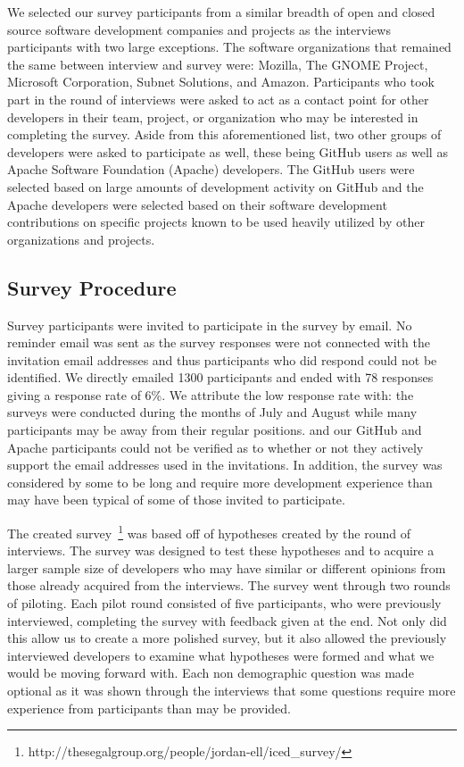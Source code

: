 \documentclass[conference]{IEEEtran}
\begin{document}
We selected our survey participants from a similar breadth of open and closed source software development 
companies and projects as the interviews participants with two large exceptions. The software organizations
that remained the same between interview and survey were: Mozilla, The GNOME Project, Microsoft Corporation, 
Subnet Solutions, and Amazon.
Participants who took part in the round of interviews were asked to act as a contact point for other 
developers in their team, project, or organization who may be interested
in completing the survey. Aside from this aforementioned list, two other groups of developers were asked to
participate as well, these being GitHub users as well as Apache Software Foundation (Apache) developers. The GitHub
users were selected based on large amounts of development activity on GitHub and the Apache developers
were selected based on their software development contributions on specific projects known to be used heavily
utilized by other organizations and projects.

\subsection{Survey Procedure}

Survey participants were invited to participate in the survey by email. No reminder email was sent as the
survey responses were not connected with the invitation email addresses and thus participants who did respond
could not be identified. We directly emailed 1300 participants and ended with 78 responses
giving a response rate of 6\%. We attribute the low response rate with: the surveys
were conducted during the months of July and August while many participants may be away from their regular positions.
and our GitHub and Apache participants could not be verified as to whether or not they actively support the
email addresses used in the invitations. In addition, the survey was considered by some to be long and require
more development experience than may have been typical of some of those invited to participate.

The created survey~\footnote{http://thesegalgroup.org/people/jordan-ell/iced\_survey/}
was based off of hypotheses created by the round of interviews. The survey
was designed to test these hypotheses and to acquire a larger sample size of developers who may have similar
or different opinions from those already acquired from the interviews. The survey went through two rounds of
piloting. Each pilot round consisted of five participants, who were previously interviewed, completing the survey
with feedback given at the end. Not only did this allow us to create a more polished survey, but it also allowed 
the previously interviewed developers to examine what hypotheses were
formed and what we would be moving forward with.
Each non demographic question was made optional as it was shown 
through the interviews that some questions require more experience from participants than may be provided.
\end{document}
